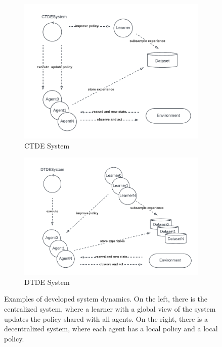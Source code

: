 \begin{figure}[t]
    \centering
    \begin{subfigure}[b]{0.49\textwidth}
        \centering
        \includegraphics[width=\textwidth]{papers/coordination2023/imgs/ctdesystem.pdf}
        \caption{CTDE System}
        \label{coordination2023:fig:ctde}
    \end{subfigure}
    \begin{subfigure}[b]{0.49\textwidth}
        \centering
        \includegraphics[width=\textwidth]{papers/coordination2023/imgs/DTDE.pdf}
        \caption{DTDE System}
        \label{coordination2023:fig:dtde}
    \end{subfigure}
\caption[Examples of developed System dynamics in \scarlib{}]{Examples of developed system dynamics. 
On the left, there is the centralized system, 
where a learner with a global view of the system 
updates the policy shared with all agents. 
%
On the right, there is a decentralized system, 
where each agent has a local policy and a local policy.}
\end{figure}


